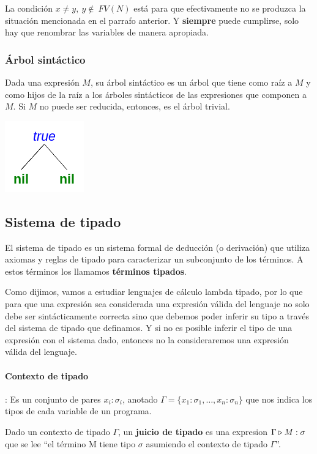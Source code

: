 La condición $x\neq y,~y\notin~FV(N)$ está para que efectivamente no se produzca la situación mencionada en el parrafo anterior. Y \textbf{siempre} puede cumplirse, solo hay que renombrar las variables de manera apropiada.

\subsubsection{Árbol sintáctico}
Dada una expresión $M$, su árbol sintáctico es un árbol que tiene como raíz a $M$ y como hijos de la raíz a los árboles sintácticos de las expresiones que componen a $M$. Si $M$ no puede ser reducida, entonces, es el árbol trivial.

\begin{center}
	    \includegraphics[scale=0.5, keepaspectratio=true]{imagenes/sintax_tree_true.png}
\end{center}
\subsection{Sistema de tipado}
El sistema de tipado es un sistema formal de deducción (o derivación) que utiliza axiomas y reglas de tipado para caracterizar un subconjunto de los términos. A estos términos los llamamos \textbf{términos tipados}.

Como dijimos, vamos a estudiar lenguajes de cálculo lambda tipado, por lo que para que una expresión sea considerada una expresión válida del lenguaje no solo debe ser sintácticamente correcta sino que debemos poder inferir su tipo a través del sistema de tipado que definamos. Y si no es posible inferir el tipo de una expresión con el sistema dado, entonces no la consideraremos una expresión válida del lenguaje.

\paragraph{Contexto de tipado}: Es un conjunto de pares $x_i:\sigma_i$, anotado $\Gamma = \{x_1:\sigma_1, \dots, x_n:\sigma_n\}$ que nos indica los tipos de cada variable de un programa.

Dado un contexto de tipado $\Gamma$, un \textbf{juicio de tipado} es una expresion $\Gamma\triangleright M : \sigma$ que se lee ``el término M tiene tipo $\sigma$ asumiendo el contexto de tipado $\Gamma$''. 

